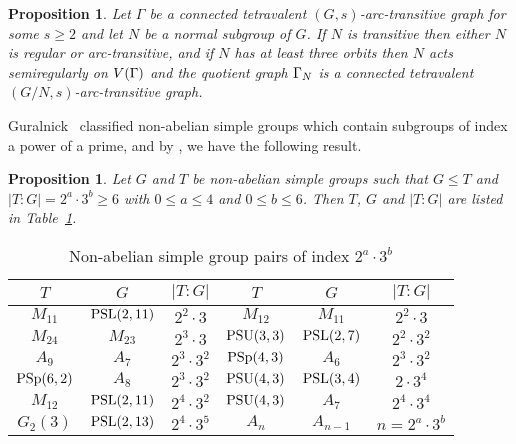 \documentclass[12pt]{article}
\newtheorem{prop}[lem]{Proposition}%
\def\PSL{\hbox{\rm PSL}}\def\PSU{\hbox{\rm PSU}}
\def\PSp{\hbox{\rm PSp}}\def\P\GammaL{\hbox{\rm P\Gamma L}} \def\ASIL{\hbox{\rm A\Sigma L}}
\begin{document}
\begin{prop}\label{prop=atlesst3orbits}
Let $\Gamma$ be a connected tetravalent $(G,s)$-arc-transitive graph for some $s\geq 2$ and let $N$ be a normal subgroup of $G$. If $N$ is transitive then either $N$ is regular or arc-transitive, and if $N$ has at least three orbits then $N$ acts semiregularly on $V(\Gamma)$ and the quotient graph $\Gamma_N$ is a connected tetravalent $(G/N,s)$-arc-transitive graph.
\end{prop}

Guralnick~\cite{Guralnick} classified non-abelian simple groups which contain subgroups of index a power of a prime, and by \cite[Theorem 1]{LiXu}, we have the following result.

\begin{prop}\label{prop=simplegroup}
Let $G$ and $T$ be non-abelian simple groups such that $G\leq T$ and $|T:G|=2^a\cdot 3^b\geq 6$ with $0\leq a\leq 4$ and $0\leq b\leq 6$.
Then $T$, $G$ and $|T:G|$ are listed in Table~\ref{table=2}.
\end{prop}

\begin{table}[ht]
\begin{center}
\begin{tabular}{|c|c|c||c|c|c|}

\hline
$T$              & $G$              & $|T:G|$              &$T$              & $G$               & $|T:G|$         \\
\hline
$M_{11}$         & $\PSL(2,11)$     & $2^2\cdot3$          &$M_{12}$         & $M_{11}$          & $2^2\cdot 3$         \\
\hline
$M_{24}$         & $M_{23}$         & $2^3\cdot 3$         &$\PSU(3,3)$      & $\PSL(2,7)$       & $2^2\cdot3^2$         \\
\hline
$A_9$            & $A_7$            & $2^3\cdot 3^2$       &$\PSp(4,3)$      & $A_6$             & $2^3\cdot 3^2$         \\
\hline
$\PSp(6,2)$     & $A_8$            & $2^3\cdot 3^2$       &$\PSU(4,3)$      & $\PSL(3,4)$       & $2\cdot3^4$          \\
\hline
$M_{12}$        & $\PSL(2,11)$     & $2^4\cdot3^2$         & $\PSU(4,3)$      & $A_7$            & $2^4\cdot3^4$         \\
\hline
$G_2(3)$        & $\PSL(2,13)$    & $2^{4}\cdot3^5$       &$A_n$      & $A_{n-1}$                & $n=2^a\cdot3^b$      \\
\hline
\end{tabular}
\end{center}
\vskip -0.5cm
\caption{{Non-abelian simple group pairs of index $2^a\cdot 3^b$}}\label{table=2}
\end{table}
\end{document}
